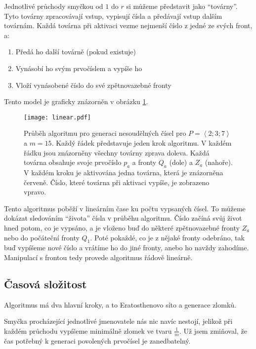 \documentclass{article}
\begin{document}
Jednotlivé průchody smyčkou od $1$ do $r$ si můžeme představit jako \enquote{továrny}. Tyto továrny zpracovávají vstup, vypisují čísla a předávají vstup dalším továrnám. Každá továrna při aktivaci vezme nejmenší číslo z jedné ze svých front, a:

\begin{enumerate}
    \item Předá ho další továrně (pokud existuje)
    \item Vynásobí ho svým prvočíslem a vypíše ho
    \item Vloží vynásobené číslo do své zpětnovazebné fronty
\end{enumerate}

Tento model je graficky znázorněn v obrázku \ref{figure:linear-steps}.

\begin{figure}[hp]
    \centering
    \texttt{[image: linear.pdf]}
    \caption[Průběh algoritmu pro generaci nesoudělných čísel]{Průběh algoritmu pro generaci nesoudělných čísel pro $P=\left<2;3;7\right>$ a $m=15$. Každý řádek představuje jeden krok algoritmu. V každém řádku jsou znázorněny všechny továrny zprava doleva. Každá továrna obsahuje svoje prvočíslo $p_a$ a fronty $Q_a$ (dole) a $Z_a$ (nahoře). V každém kroku je aktivována jedna továrna, která je znázorněna červeně. Číslo, které továrna při aktivaci vypíše, je zobrazeno vpravo.}
    \label{figure:linear-steps}
\end{figure}

Tento algoritmus poběží v lineárním čase ku počtu vypsaných čísel. To můžeme dokázat sledováním \enquote{života} čísla v průběhu algoritmu. Číslo začíná svůj život hned potom, co je vypsáno, a je vloženo buď do některé zpětnovazebné fronty $Z_a$ nebo do počáteční fronty $Q_1$. Poté pokaždé, co je z nějaké fronty odebráno, tak buď vypíšeme nové číslo a vrátíme ho do jiné fronty, anebo ho navždy zahodíme. Manipulací s frontou tedy provede algoritmus řádově lineárně.

\subsection{Časová složitost}

Algoritmus má dva hlavní kroky, a to Eratosthenovo síto a generace zlomků.

Smyčka procházející jednotlivé jmenovatele nás nic navíc nestojí, jelikož při každém průchodu vypíšeme minimálně zlomek ve tvaru $\frac{1}{m}$. Už jsem zmiňoval, že čas potřebný k generaci povolených prvočísel je zanedbatelný.
\end{document}
